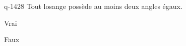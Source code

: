 \begin{truefalse}{q-1428}
Tout losange possède au moins deux angles égaux.
\item* Vrai
\item Faux
\end{truefalse}

